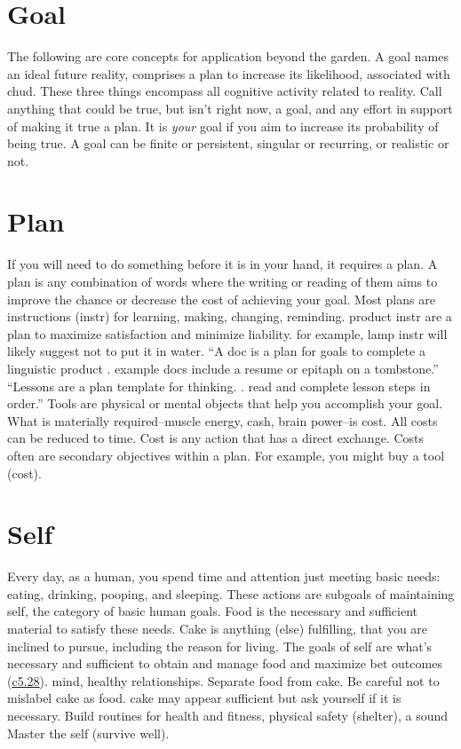 \documentclass[
]{book}
\begin{document}
\hypertarget{goal}{%
\section{Goal}\label{goal}}

The following are core concepts for application beyond the garden.
A goal names an ideal future reality, comprises a plan to increase its likelihood, associated with chud.
These three things encompass all cognitive activity related to reality.
Call anything that could be true, but isn't right now, a goal, and any effort in support of making it true a plan.
It is \emph{your} goal if you aim to increase its probability of being true.
A goal can be finite or persistent, singular or recurring, or realistic or not.

\hypertarget{plan}{%
\section{Plan}\label{plan}}

If you will need to do something before it is in your hand, it requires a plan.
A plan is any combination of words where the writing or reading of them aims to improve the chance or decrease the cost of achieving your goal.
Most plans are instructions (instr) for learning, making, changing, reminding. product instr are a plan to maximize satisfaction and minimize liability. for example, lamp instr will likely suggest not to put it in water.
``A doc is a plan for goals to complete a linguistic product . example docs include a resume or epitaph on a tombstone.''
``Lessons are a plan template for thinking. . read and complete lesson steps in order.''
Tools are physical or mental objects that help you accomplish your goal.
What is materially required--muscle energy, cash, brain power--is cost.
All costs can be reduced to time.
Cost is any action that has a direct exchange.
Costs often are secondary objectives within a plan.
For example, you might buy a tool (cost).

\hypertarget{self-self}{%
\section{Self}\label{self-self}}

Every day, as a human, you spend time and attention just meeting basic needs: eating, drinking, pooping, and sleeping.
These actions are subgoals of maintaining self, the category of basic human goals.
Food is the necessary and sufficient material to satisfy these needs.
Cake is anything (else) fulfilling, that you are inclined to pursue, including the reason for living.
The goals of self are what's necessary and sufficient to obtain and manage food and maximize bet outcomes (\protect\hyperlink{word-bet}{c5.28}). mind, healthy relationships.
Separate food from cake.
Be careful not to mislabel cake as food. cake may appear sufficient but ask yourself if it is necessary.
Build routines for health and fitness, physical safety (shelter), a sound
Master the self (survive well).
\end{document}
